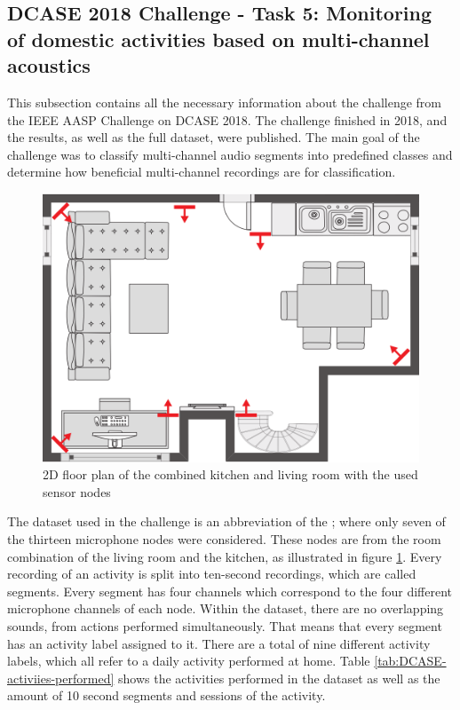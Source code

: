 \subsection[DCASE 2018 Challenge - Task 5 dataset]{DCASE 2018 Challenge - Task 5: Monitoring of domestic activities based on multi-channel acoustics }
\label{sub:DCASE-Task-Dataset}
This subsection contains all the necessary information about the challenge from the IEEE AASP Challenge on \gls{DCASE} 2018. The challenge finished in 2018, and the results, as well as the full dataset, were published. The main goal of the challenge was to classify multi-channel audio segments into predefined classes and determine how beneficial multi-channel recordings are for classification. 

\begin{figure}[htbp]
	\centering
	\includegraphics[scale=0.8]{baa-documentation/img/DCASE_floor_map.png}
	\caption[2D floor plan of the combined kitchen and living room from DCASE]{2D floor plan of the combined kitchen and living room with the used sensor nodes \footnotemark}
	\label{fig:dcase-recordings-floor-plan}
\end{figure}
\noindent
The dataset used in the challenge is an abbreviation of the ; where only seven of the thirteen microphone nodes were considered. These nodes are from the room combination of the living room and the kitchen, as illustrated in figure \ref{fig:dcase-recordings-floor-plan}. Every recording of an activity is split into ten-second recordings, which are called segments. Every segment has four channels which correspond to the four different microphone channels of each node. Within the dataset, there are no overlapping sounds, from actions performed simultaneously. That means that every segment has an activity label assigned to it. There are a total of nine different activity labels, which all refer to a daily activity performed at home. Table \ref{tab:DCASE-activiies-performed} shows the activities performed in the dataset as well as the amount of 10 second segments and sessions of the activity.
